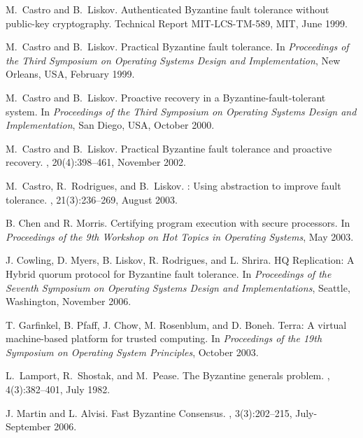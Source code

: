 \documentclass[times, 10pt, twocolumn]{article}
\begin{document}
\begin{thebibliography}{10}\setlength{\itemsep}{-1ex}\small

M.~Castro and B.~Liskov.
\newblock Authenticated {Byzantine} fault tolerance without public-key
  cryptography.
\newblock Technical Report MIT-LCS-TM-589, MIT, June 1999.

M.~Castro and B.~Liskov.
\newblock Practical {Byzantine} fault tolerance.
\newblock In {\em Proceedings of the Third Symposium on Operating Systems
  Design and Implementation}, New Orleans, USA, February 1999.

M.~Castro and B.~Liskov.
\newblock Proactive recovery in a {Byzantine}-fault-tolerant system.
\newblock In {\em Proceedings of the Third Symposium on Operating Systems
  Design and Implementation}, San Diego, USA, October 2000.

M.~Castro and B.~Liskov.
\newblock Practical {Byzantine} fault tolerance and proactive recovery.
, 20(4):398--461, November
  2002.

M.~Castro, R.~Rodrigues, and B.~Liskov.
: Using abstraction to improve fault tolerance.
, 21(3):236--269, August
  2003.

B. Chen and R. Morris. 
\newblock Certifying program execution with secure processors. 
\newblock In {\em Proceedings of the 9th Workshop on Hot Topics in 
Operating Systems}, May 2003.

J. Cowling, D. Myers, B. Liskov, R. Rodrigues, and L. Shrira.
\newblock HQ Replication: A Hybrid quorum protocol for Byzantine fault 
tolerance.
\newblock In {\em Proceedings of the Seventh Symposium on Operating Systems 
Design and Implementations}, Seattle, Washington, November 2006.

T. Garfinkel, B. Pfaff, J. Chow, M. Rosenblum, and D. Boneh. 
\newblock Terra: A virtual machine-based platform for trusted computing. 
\newblock In {\em Proceedings of the 19th Symposium on Operating System 
Principles}, October 2003.

L.~Lamport, R.~Shostak, and M.~Pease.
\newblock The {B}yzantine generals problem.
,
  4(3):382--401, July 1982.

J. Martin and L. Alvisi.
\newblock Fast Byzantine Consensus.
,
3(3):202--215, July-September 2006.


\end{thebibliography}
\end{document}
